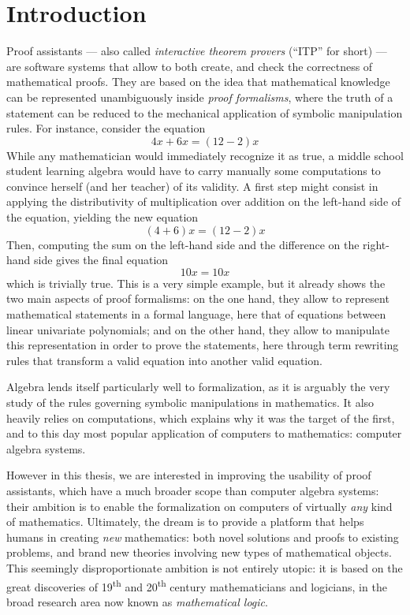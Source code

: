 \setchapterpreamble[u]{\margintoc}
\chapter{Introduction}


Proof assistants --- also called \emph{interactive theorem provers} (``ITP'' for
short) --- are software systems that allow to both create, and check the
correctness of mathematical proofs. They are based on the idea that mathematical
knowledge can be represented unambiguously inside \emph{proof formalisms}, where
the truth of a statement can be reduced to the mechanical application of
symbolic manipulation rules. For instance, consider the equation
$$4x + 6x = (12 - 2)x$$ 
While any mathematician would immediately recognize it as true, a middle school
student learning algebra would have to carry manually some computations to
convince herself (and her teacher) of its validity. A first step might consist
in applying the distributivity of multiplication over addition on the left-hand
side of the equation, yielding the new equation
$$(4 + 6)x = (12 - 2)x$$
Then, computing the sum on the left-hand side and the difference on the
right-hand side gives the final equation
$$10x = 10x$$
which is trivially true. This is a very simple example, but it already shows the
two main aspects of proof formalisms: on the one hand, they allow to represent
mathematical statements in a formal language, here that of equations between
linear univariate polynomials; and on the other hand, they allow to manipulate
this representation in order to prove the statements, here through term
rewriting rules that transform a valid equation into another valid equation.

Algebra lends itself particularly well to formalization, as it is arguably the
very study of the rules governing symbolic manipulations in mathematics. It also
heavily relies on computations, which explains why it was the target of the
first, and to this day most popular application of computers to mathematics:
computer algebra systems.

However in this thesis, we are interested in improving the usability of proof
assistants, which have a much broader scope than computer algebra systems: their
ambition is to enable the formalization on computers of virtually \emph{any}
kind of mathematics. Ultimately, the dream is to provide a platform that helps
humans in creating \emph{new} mathematics: both novel solutions and proofs to
existing problems, and brand new theories involving new types of mathematical
objects. This seemingly disproportionate ambition is not entirely utopic: it is
based on the great discoveries of 19\textsuperscript{th} and
20\textsuperscript{th} century mathematicians and logicians, in the broad
research area now known as \emph{mathematical logic}.

